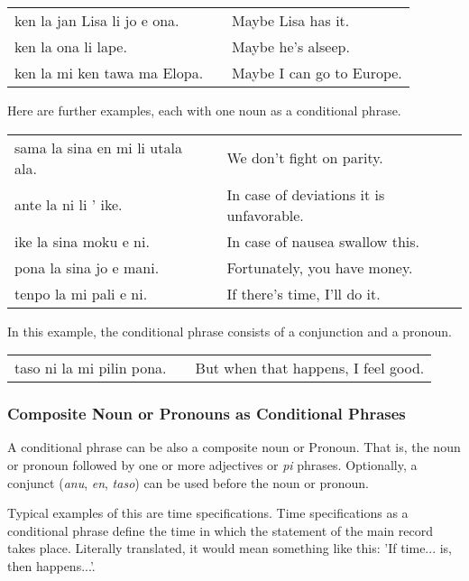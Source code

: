 \begin{supertabular}{p{5,5cm}|ll}
    ken la jan Lisa li jo e ona. &  & Maybe Lisa has it.        \\
    ken la ona li lape.          &  & Maybe he's alseep.        \\
    ken la mi ken tawa ma Elopa. &  & Maybe I can go to Europe. \\
\end{supertabular}

Here are further examples, each with one noun as a conditional phrase.

\begin{supertabular}{p{5,5cm}|ll}
    sama la sina en mi li utala ala. &  & We don't fight on parity.                \\
    ante la ni li ' ike.             &  & In case of deviations it is unfavorable. \\
    ike la sina moku e ni.           &  & In case of nausea swallow this.          \\
    pona la sina jo e mani.          &  & Fortunately, you have money.             \\
    tenpo la mi pali e ni.           &  & If there's time, I'll do it.             \\

\end{supertabular}

In this example, the conditional phrase consists of a conjunction and a pronoun.

\begin{supertabular}{p{5,5cm}|ll}
    taso ni la mi pilin pona. &  & But when that happens, I feel good. \\
\end{supertabular}

\subsubsection*{Composite Noun or Pronouns as Conditional Phrases}
A conditional phrase can be also a composite noun or Pronoun.
That is, the noun or pronoun followed by one or more adjectives or \textit{pi} phrases.
Optionally, a conjunct (\textit{anu}, \textit{en}, \textit{taso}) can be used before the noun or pronoun.

Typical examples of this are time specifications.
Time specifications as a conditional phrase define the time in which the statement of the main record takes place.
Literally translated, it would mean something like this: 'If time... is, then happens...'.

